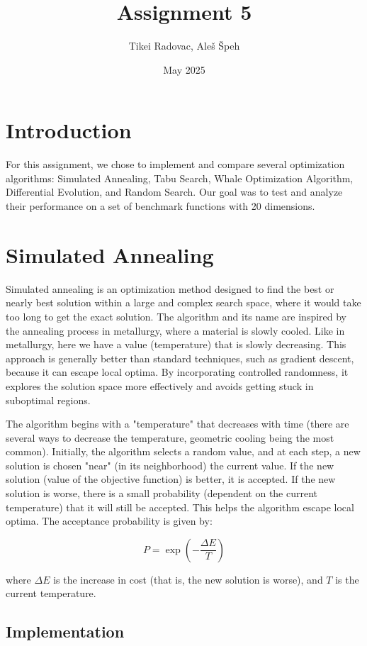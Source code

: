 \documentclass{report}
\title{Assignment 5}
\author{Tikei Radovac, Aleš Špeh}
\date{May 2025}
\begin{document}
\maketitle

\section*{Introduction}

For this assignment, we chose to implement and compare several optimization algorithms: Simulated Annealing, Tabu Search, Whale Optimization Algorithm, Differential Evolution, and Random Search. Our goal was to test and analyze their performance on a set of benchmark functions with 20 dimensions.

\section*{Simulated Annealing}

Simulated annealing is an optimization method designed to find the best or nearly best solution within a large and complex search space, where it would take too long to get the exact solution. The algorithm and its name are inspired by the annealing process in metallurgy, where a material is slowly cooled. Like in metallurgy, here we have a value (temperature) that is slowly decreasing. This approach is generally better than standard techniques, such as gradient descent, because it can escape local optima. By incorporating controlled randomness, it explores the solution space more effectively and avoids getting stuck in suboptimal regions.


The algorithm begins with a "temperature" that decreases with time (there are several ways to decrease the temperature, geometric cooling being the most common). Initially, the algorithm selects a random value, and at each step, a new solution is chosen "near" (in its neighborhood) the current value. If the new solution (value of the objective function) is better, it is accepted. If the new solution is worse, there is a small probability (dependent on the current temperature) that it will still be accepted. This helps the algorithm escape local optima. The acceptance probability is given by:

\[
P = \exp\left(-\frac{\Delta E}{T}\right)
\]

where \(\Delta E\) is the increase in cost (that is, the new solution is worse), and \(T\) is the current temperature.

\subsection*{Implementation}
\end{document}
